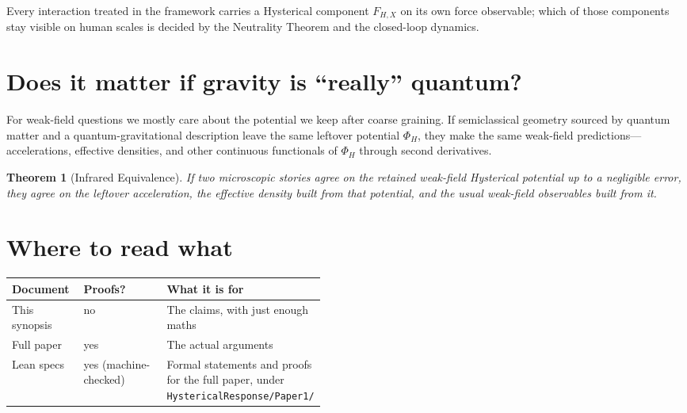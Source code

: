 \documentclass[11pt]{article}
\newtheorem{theorem}{Theorem}[section]
\theoremstyle{remark}
\begin{document}
Every interaction treated in the framework carries a Hysterical component $F_{H,X}$ on its own force observable; which of those components stay visible on human scales is decided by the Neutrality Theorem and the closed-loop dynamics.

\section{Does it matter if gravity is ``really'' quantum?}
For weak-field questions we mostly care about the potential we keep after coarse graining.
If semiclassical geometry sourced by quantum matter and a quantum-gravitational description leave the same leftover potential $\Phi_H$, they make the same weak-field predictions---accelerations, effective densities, and other continuous functionals of $\Phi_H$ through second derivatives.

\begin{theorem}[Infrared Equivalence]
If two microscopic stories agree on the retained weak-field Hysterical potential up to a negligible error, they agree on the leftover acceleration, the effective density built from that potential, and the usual weak-field observables built from it.
\end{theorem}

\section{Where to read what}
\begin{center}
\begin{tabular}{@{}llp{0.46\linewidth}@{}}
\toprule
Document & Proofs? & What it is for \\
\midrule
This synopsis & no & The claims, with just enough maths \\
Full paper & yes & The actual arguments \\
Lean specs & yes (machine-checked) & Formal statements and proofs for the full paper, under \texttt{HystericalResponse/Paper1/} \\
\bottomrule
\end{tabular}
\end{center}
\end{document}
